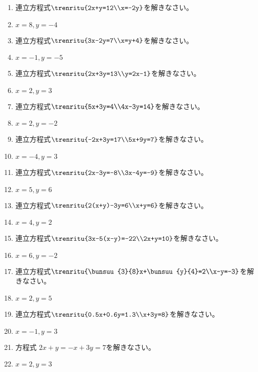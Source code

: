 \documentclass[uplatex,a4j,11pt]{jsreport}
\begin{document}
\begin{multicols}{2}
\begin{enumerate}
    \item 連立方程式\quad$\trenritu{2x+y=12\\x=-2y}$\quad を解きなさい。%
    \item $x=8, y=-4$
    \item 連立方程式\quad$\trenritu{3x-2y=7\\x=y+4}$\quad を解きなさい。%
    \item $x=-1, y=-5$
    \item 連立方程式\quad$\trenritu{2x+3y=13\\y=2x-1}$\quad を解きなさい。%
    \item $x=2, y=3$
    \item 連立方程式\quad$\trenritu{5x+3y=4\\4x-3y=14}$\quad を解きなさい。%
    \item $x=2, y=-2$
    \item 連立方程式\quad$\trenritu{-2x+3y=17\\5x+9y=7}$\quad を解きなさい。%
    \item $x=-4, y=3$
    \item 連立方程式\quad$\trenritu{2x-3y=-8\\3x-4y=-9}$\quad を解きなさい。%
    \item $x=5, y=6$
    \item 連立方程式\quad$\trenritu{2(x+y)-3y=6\\x+y=6}$\quad を解きなさい。%
    \item $x=4, y=2$
    \item 連立方程式\quad$\trenritu{3x-5(x-y)=-22\\2x+y=10}$\quad を解きなさい。%
    \item $x=6, y=-2$
    \item 連立方程式\quad$\trenritu{\bunsuu{3}{8}x+\bunsuu{y}{4}=2\\x-y=-3}$\quad を解きなさい。%
    \item $x=2, y=5$
    \item 連立方程式\quad$\trenritu{0.5x+0.6y=1.3\\x+3y=8}$\quad を解きなさい。%
    \item $x=-1, y=3$
    \item 方程式 $2x+y = -x+3y = 7$\quad を解きなさい。%
    \item $x=2, y=3$

\end{enumerate}
\end{multicols}
\end{document}
